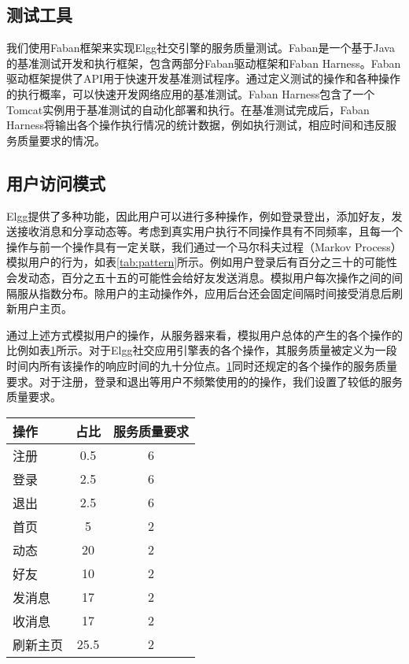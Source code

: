\subsection{测试工具}
我们使用Faban框架来实现Elgg社交引擎的服务质量测试。Faban是一个基于Java的基准测试开发和执行框架，包含两部分Faban驱动框架和Faban Harness。Faban驱动框架提供了API用于快速开发基准测试程序。通过定义测试的操作和各种操作的执行概率，可以快速开发网络应用的基准测试。Faban Harness包含了一个Tomcat实例用于基准测试的自动化部署和执行。在基准测试完成后，Faban Harness将输出各个操作执行情况的统计数据，例如执行测试，相应时间和违反服务质量要求的情况。

\subsection{用户访问模式}
Elgg提供了多种功能，因此用户可以进行多种操作，例如登录登出，添加好友，发送接收消息和分享动态等。考虑到真实用户执行不同操作具有不同频率，且每一个操作与前一个操作具有一定关联，我们通过一个马尔科夫过程（Markov Process）模拟用户的行为，如表\ref{tab:pattern}所示。例如用户登录后有百分之三十的可能性会发动态，百分之五十五的可能性会给好友发送消息。模拟用户每次操作之间的间隔服从指数分布。除用户的主动操作外，应用后台还会固定间隔时间接受消息后刷新用户主页。



通过上述方式模拟用户的操作，从服务器来看，模拟用户总体的产生的各个操作的比例如表\ref{tab:mix}所示。对于Elgg社交应用引擎表的各个操作，其服务质量被定义为一段时间内所有该操作的响应时间的九十分位点。\ref{tab:mix}同时还规定的各个操作的服务质量要求。对于注册，登录和退出等用户不频繁使用的的操作，我们设置了较低的服务质量要求。

\begin{table}[!htp]
  \centering
  \label{tab:mix}
  \begin{tabular}{@{}lcc@{}} \toprule
    操作 & 占比 & 服务质量要求\\ 
    \midrule
    注册 & 0.5 & 6 \\
    登录 & 2.5 & 6 \\
    退出 & 2.5 & 6 \\
    首页 & 5 & 2 \\
    动态 & 20 & 2 \\
    好友 & 10 & 2 \\
    发消息 & 17 & 2 \\
    收消息 & 17 & 2 \\
    刷新主页 & 25.5 & 2\\
    \bottomrule
  \end{tabular}  
\end{table}


